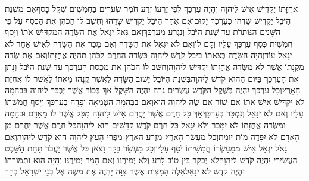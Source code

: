 \documentclass[../main/main.tex]{subfiles}
\begin{document}
\begin{multicols*}{\ncols}
אֲחֻזָּתוֹ יַקְדִּישׁ אִישׁ לַיהוָה וְהָיָה עַרְכַּךְ\SubEnd{} לְפִי זַרְעוֹ זֶרַע חֹמֶר שְׂעֹרִים בַּחֲמִשִּׁים שֶׁקֶל כָּסֶף\PreVerseSpace{}אִם מִשְּׁנַת הַיֹּבֵל יַקְדִּישׁ שָׂדֵהוּ כְּעַרְכַּךְ\SubEnd{} יָקוּם\PreVerseSpace{}וְאִם אַחַר הַיֹּבֵל יַקְדִּישׁ שָׂדֵהוּ וְחִשַּׁב לוֹ הַכֹּהֵן אֶת הַכֶּסֶף עַל פִּי הַשָּׁנִים הַנּוֹתָרֹת עַד שְׁנַת הַיֹּבֵל וְנִגְרַע מֵעַרְכָּךְ\SubEnd{}\PreVerseSpace{}וְאִם גָּאֹל יִגְאַל אֶת הַשָּׂדֶה הַמַּקְדִּישׁ אֹתוֹ וְיָסַף חֲמִשִׁית כֶּסֶף עַרְכַּךְ\SubEnd{} עָלָיו וְקָם לוֹ\PreVerseSpace{}וְאִם לֹא יִגְאַל אֶת הַשָּׂדֶה וְאִם מָכַר אֶת הַשָּׂדֶה לְאִישׁ אַחֵר לֹא יִגָּאֵל עוֹד\PreVerseSpace{}וְהָיָה הַשָּׂדֶה בְּצֵאתוֹ בַיֹּבֵל קֹדֶשׁ לַיהוָה כִּשְׂדֵה הַחֵרֶם לַכֹּהֵן תִּהְיֶה אֲחֻזָּתוֹ\PreVerseSpace{}וְאִם אֶת שְׂדֵה מִקְנָתוֹ אֲשֶׁר לֹא מִשְּׂדֵה אֲחֻזָּתוֹ יַקְדִּישׁ לַיהוָה\PreVerseSpace{}וְחִשַּׁב לוֹ הַכֹּהֵן אֵת מִכְסַת הָעַרְכַּךְ\SubEnd{} עַד שְׁנַת הַיֹּבֵל וְנָתַן אֶת הָעַרְכַּךְ\SubEnd{} בַּיּוֹם הַהוּא קֹדֶשׁ לַיהוָה\PreVerseSpace{}בִּשְׁנַת הַיּוֹבֵל יָשׁוּב הַשָּׂדֶה לַאֲשֶׁר קָנָהוּ מֵאִתּוֹ לַאֲשֶׁר לוֹ אֲחֻזַּת הָאָרֶץ\PreVerseSpace{}וְכָל עַרְכַּךְ\SubEnd{} יִהְיֶה בְּשֶׁקֶל הַקֹּדֶשׁ עֶשְׂרִים גֵּרָה יִהְיֶה הַשָּׁקֶל \ClosedSection{}אַךְ בְּכוֹר אֲשֶׁר יְבֻכַּר לַיהוָה בִּבְהֵמָה לֹא יַקְדִּישׁ אִישׁ אֹתוֹ אִם שׁוֹר אִם שֶׂה לַיהוָה הוּא\PreVerseSpace{}וְאִם בַּבְּהֵמָה הַטְּמֵאָה וּפָדָה בְעַרְכַּךְ\SubEnd{} וְיָסַף חֲמִשִׁתוֹ עָלָיו וְאִם לֹא יִגָּאֵל וְנִמְכַּר בְּעַרְכָּךְ\SubEnd{}\PreVerseSpace{}אַךְ כָּל חֵרֶם אֲשֶׁר יַחֲרִם אִישׁ לַיהוָה מִכָּל אֲשֶׁר לוֹ מֵאָדָם וּבְהֵמָה וּמִשְּׂדֵה אֲחֻזָּתוֹ לֹא יִמָּכֵר וְלֹא יִגָּאֵל כָּל חֵרֶם קֹדֶשׁ קָדָשִׁים הוּא לַיהוָה\PreVerseSpace{}כָּל חֵרֶם אֲשֶׁר יָחֳרַם מִן הָאָדָם לֹא יִפָּדֶה מוֹת יוּמָת\PreVerseSpace{}וְכָל מַעְשַׂר הָאָרֶץ מִזֶּרַע הָאָרֶץ מִפְּרִי הָעֵץ לַיהוָה הוּא קֹדֶשׁ לַיהוָה\PreVerseSpace{}וְאִם גָּאֹל יִגְאַל אִישׁ מִמַּעַשְׂרוֹ חֲמִשִׁיתוֹ יֹסֵף עָלָיו\PreVerseSpace{}וְכָל מַעְשַׂר בָּקָר וָצֹאן כֹּל אֲשֶׁר יַעֲבֹר תַּחַת הַשָּׁבֶט הָעֲשִׂירִי יִהְיֶה קֹּדֶשׁ לַיהוָה\PreVerseSpace{}לֹא יְבַקֵּר בֵּין טוֹב לָרַע וְלֹא יְמִירֶנּוּ וְאִם הָמֵר יְמִירֶנּוּ וְהָיָה הוּא וּתְמוּרָתוֹ יִהְיֶה קֹדֶשׁ לֹא יִגָּאֵל\PreVerseSpace{}אֵלֶּה הַמִּצְוֺת אֲשֶׁר צִוָּה יַהְוֶה אֶת מֹשֶׁה אֶל בְּנֵי יִשְׂרָאֵל בְּהַר\par
\end{multicols*}
\end{document}
